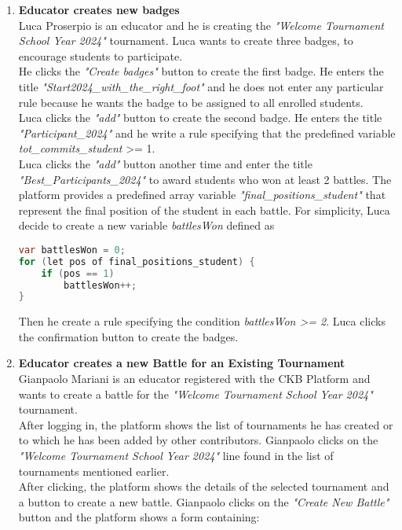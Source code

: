 \begin{enumerate}
	\item \textbf{Educator creates new badges}\\
	      Luca Proserpio is an educator and he is creating the \emph{"Welcome Tournament School Year 2024"} tournament.
	      Luca wants to create three badges, to encourage students to participate.\\
	      He clicks the \emph{"Create badges"} button to create the first badge.
	      He enters the title \emph{"Start2024_with_the_right_foot"} and he does not enter any particular rule because he wants the badge to be assigned to all enrolled students.\\
	      Luca clicks the \emph{"add"} button to create the second badge.
	      He enters the title \emph{"Participant_2024"} and he write a rule specifying that the predefined variable \emph{tot_commits_student} >= 1.\\
	      Luca clicks the \emph{"add"} button another time and enter the title \emph{"Best_Participants_2024"} to award students who won at least 2 battles.
	      The platform provides a predefined array variable \emph{"final_positions_student"} that represent the final position of the student in each battle.
	      For simplicity, Luca decide to create a new variable \emph{battlesWon} defined as
	      \begin{lstlisting}[language=java, morekeywords={var, let, of}, keywordstyle=\color{blue}]
var battlesWon = 0;
for (let pos of final_positions_student) {
	if (pos == 1)
		battlesWon++;
}
		  \end{lstlisting}
	      Then he create a rule specifying the condition \emph{battlesWon >= 2}.
	      Luca clicks the confirmation button to create the badges.


	\item \textbf{Educator creates a new Battle for an Existing Tournament}\\
	      Gianpaolo Mariani is an educator registered with the CKB Platform and wants to create a battle for the \emph{"Welcome Tournament School Year 2024"} tournament.\\
	      After logging in, the platform shows the list of tournaments he has created or to which he has been added by other contributors. Gianpaolo clicks on the \emph{"Welcome
		      Tournament School Year 2024"} line found in the list of tournaments mentioned earlier.\\
	      After clicking, the platform shows the details of the selected tournament and a button to create a new battle.
	      Gianpaolo clicks on the \emph{"Create New Battle"} button and the platform shows a form containing:


\end{enumerate}

